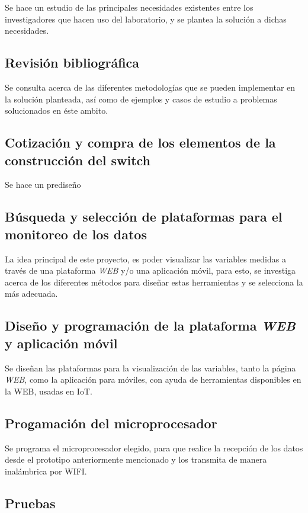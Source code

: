 Se hace un estudio de las principales necesidades existentes entre los investigadores que hacen uso del laboratorio, y se plantea la solución a dichas necesidades.  

\subsection{Revisión bibliográfica}

Se consulta acerca de las diferentes metodologías que se pueden implementar en la solución planteada, así como de ejemplos y casos de estudio a problemas solucionados en éste ambito. 

\subsection{Cotización y compra de los elementos de la construcción del switch}

Se hace un prediseño 

\subsection{Búsqueda y selección de plataformas para el monitoreo de los datos}

La idea principal de este proyecto, es poder visualizar las variables medidas a través de una plataforma \textit{WEB} y/o una aplicación móvil, para esto, se investiga acerca de los diferentes métodos para diseñar estas herramientas y se selecciona la más adecuada.

\subsection{Diseño y programación de la plataforma \textit{WEB} y aplicación móvil}

Se diseñan las plataformas para la visualización de las variables, tanto la página \textit{WEB}, como la aplicación para móviles, con ayuda de herramientas disponibles en la WEB, usadas en IoT.

\subsection{Progamación del microprocesador}

Se programa el microprocesador elegido, para que realice la recepción de los datos desde el prototipo anteriormente mencionado y los transmita de manera inalámbrica por WIFI.  

\subsection{Pruebas}


